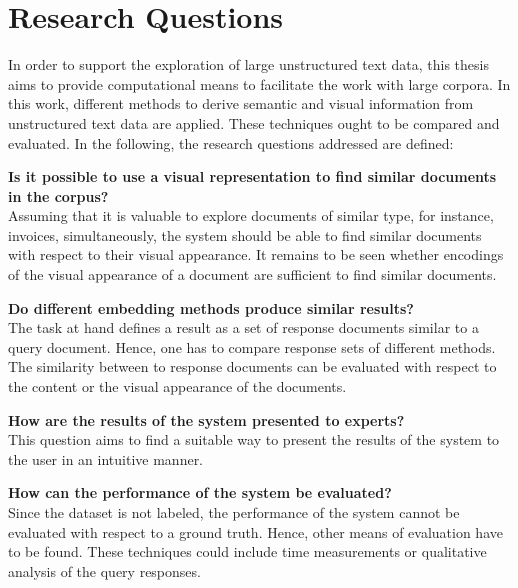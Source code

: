 \section{Research Questions}\label{sec:research-questions}

In order to support the exploration of large unstructured text data, 
this thesis aims to provide computational means to facilitate the work with large corpora.
In this work, different methods to derive semantic and visual information from unstructured text data are applied.
These techniques ought to be compared and evaluated.
In the following, the research questions addressed are defined:
\begin{questions}%
    \item \textbf{Is it possible to use a visual representation to find similar documents in the corpus?}\label{enum:rq1} \hfill \\
    Assuming that it is valuable to explore documents of similar type, for instance, invoices, simultaneously,
    the system should be able to find similar documents with respect to their visual appearance.
    It remains to be seen whether encodings of the visual appearance of a document are sufficient to find similar documents.

    \item \textbf{Do different embedding methods produce similar results?}\label{enum:rq2} \hfill \\
    The task at hand defines a result as a set of response documents similar to a query document.
    Hence, one has to compare response sets of different methods.
    The similarity between to response documents can be evaluated with respect to the content or the visual appearance of the documents. 
    
    \item \textbf{How are the results of the system presented to experts?}\label{enum:rq3} \hfill \\
    This question aims to find a suitable way to present the results of the system to the user in an intuitive manner.
    
    \item \textbf{How can the performance of the system be evaluated?}\label{enum:rq4} \hfill \\
    Since the dataset is not labeled, the performance of the system cannot be evaluated with respect to a ground truth.
    Hence, other means of evaluation have to be found.
    These techniques could include time measurements or qualitative analysis of the query responses.

\end{questions}